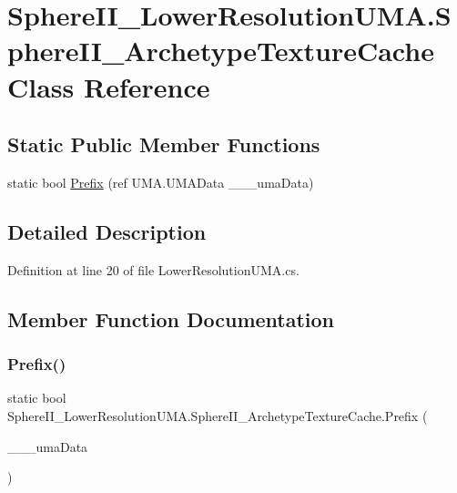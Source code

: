 \hypertarget{class_sphere_i_i___lower_resolution_u_m_a_1_1_sphere_i_i___archetype_texture_cache}{}\section{Sphere\+I\+I\+\_\+\+Lower\+Resolution\+U\+M\+A.\+Sphere\+I\+I\+\_\+\+Archetype\+Texture\+Cache Class Reference}
\label{class_sphere_i_i___lower_resolution_u_m_a_1_1_sphere_i_i___archetype_texture_cache}
\subsection*{Static Public Member Functions}
\begin{DoxyCompactItemize}
\item 
static bool \mbox{\hyperlink{class_sphere_i_i___lower_resolution_u_m_a_1_1_sphere_i_i___archetype_texture_cache_a1c017814c17899fef2a11f078fb69ee4}{Prefix}} (ref U\+M\+A.\+U\+M\+A\+Data \+\_\+\+\_\+\+\_\+uma\+Data)
\end{DoxyCompactItemize}


\subsection{Detailed Description}


Definition at line 20 of file Lower\+Resolution\+U\+M\+A.\+cs.



\subsection{Member Function Documentation}
\mbox{\label{class_sphere_i_i___lower_resolution_u_m_a_1_1_sphere_i_i___archetype_texture_cache_a1c017814c17899fef2a11f078fb69ee4}} 
\subsubsection{\texorpdfstring{Prefix()}{Prefix()}}
{\footnotesize\ttfamily static bool Sphere\+I\+I\+\_\+\+Lower\+Resolution\+U\+M\+A.\+Sphere\+I\+I\+\_\+\+Archetype\+Texture\+Cache.\+Prefix (\begin{DoxyParamCaption}\item[{ref U\+M\+A.\+U\+M\+A\+Data}]{\+\_\+\+\_\+\+\_\+uma\+Data }\end{DoxyParamCaption})\hspace{0.3cm}{\ttfamily [static]}}



